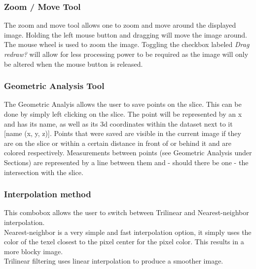 \subsubsection{Zoom / Move Tool}
The zoom and move tool allows one to zoom and move around the displayed image. Holding the left mouse button and dragging will move the image around. The mouse wheel is used to zoom the image. Toggling the checkbox labeled \textit{Drag redraw?} will allow for less processing power to be required as the image will only be altered when the mouse button is released.

\subsubsection{Geometric Analysis Tool}\label{sec:2dGeometricAnalysis}
The Geometric Analyis allows the user to save points on the slice. This can be done by simply left clicking on the slice. The point will be represented by an x and has its name, as well as its 3d coordinates within the dataset next to it [name (x, y, z)]. Points that were saved are visible in the current image if they are on the slice or within a certain distance in front of or behind it and are colored respectively. Measurements between points (see Geometric Analysis under Sections) are represented by a line between them and - should there be one - the intersection with the slice.

\subsubsection{Interpolation method}
This combobox allows the user to switch between Trilinear and Nearest-neighbor interpolation.\\
Nearest-neighbor is a very simple and fast interpolation option, it simply uses the color of the texel closest to the pixel center for the pixel color. This results in a more blocky image.\\
Trilinear filtering uses linear interpolation to produce a smoother image.


